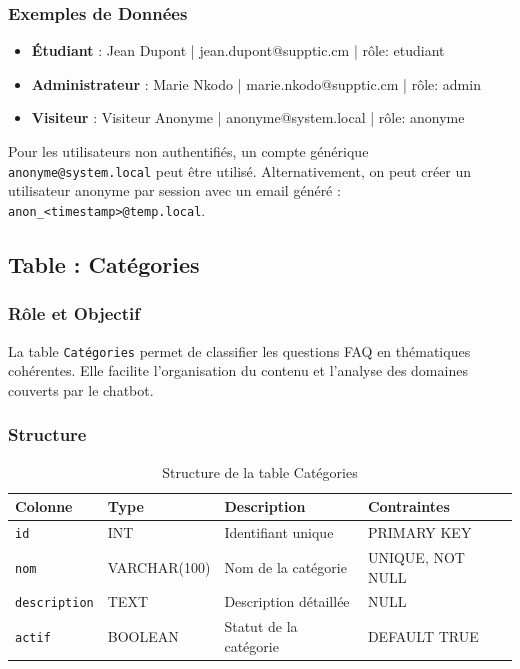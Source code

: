 \documentclass[11pt,a4paper]{article}
\begin{document}
\subsubsection{Exemples de Données}

\begin{exemple}
\begin{itemize}
    \item \textbf{Étudiant} : Jean Dupont | jean.dupont@supptic.cm | rôle: etudiant
    \item \textbf{Administrateur} : Marie Nkodo | marie.nkodo@supptic.cm | rôle: admin
    \item \textbf{Visiteur} : Visiteur Anonyme | anonyme@system.local | rôle: anonyme
\end{itemize}
\end{exemple}

\begin{info}
Pour les utilisateurs non authentifiés, un compte générique \texttt{anonyme@system.local} peut être utilisé. Alternativement, on peut créer un utilisateur anonyme par session avec un email généré : \texttt{anon\_<timestamp>@temp.local}.
\end{info}

\clearpage

\subsection{Table : Catégories}

\subsubsection{Rôle et Objectif}

La table \texttt{Catégories} permet de classifier les questions FAQ en thématiques cohérentes. Elle facilite l'organisation du contenu et l'analyse des domaines couverts par le chatbot.

\subsubsection{Structure}

\begin{table}[H]
\centering
\small
\begin{tabular}{|l|l|l|l|}
\hline
\textbf{Colonne} & \textbf{Type} & \textbf{Description} & \textbf{Contraintes} \\
\hline
\texttt{id} & INT & Identifiant unique & PRIMARY KEY \\
\hline
\texttt{nom} & VARCHAR(100) & Nom de la catégorie & UNIQUE, NOT NULL \\
\hline
\texttt{description} & TEXT & Description détaillée & NULL \\
\hline
\texttt{actif} & BOOLEAN & Statut de la catégorie & DEFAULT TRUE \\
\hline
\end{tabular}
\caption{Structure de la table Catégories}
\end{table}
\end{document}
